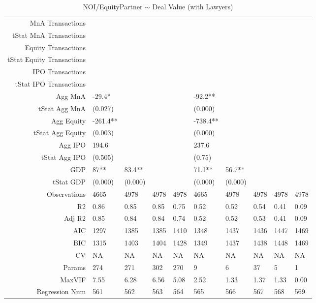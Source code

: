 \begin{table}[ht]
\begin{tabular}{rlllllllll}
  MnA Transactions &  &  &  &  &  &  &  &  &  \\ 
  tStat MnA Transactions &  &  &  &  &  &  &  &  &  \\ 
  Equity Transactions &  &  &  &  &  &  &  &  &  \\ 
  tStat Equity Transactions &  &  &  &  &  &  &  &  &  \\ 
  IPO Transactions &  &  &  &  &  &  &  &  &  \\ 
  tStat IPO Transactions &  &  &  &  &  &  &  &  &  \\ 
  Agg MnA & -29.4* &  &  &  & -92.2** &  &  &  &  \\ 
  tStat Agg MnA & (0.027) &  &  &  & (0.000) &  &  &  &  \\ 
  Agg Equity & -261.4** &  &  &  & -738.4** &  &  &  &  \\ 
  tStat Agg Equity & (0.003) &  &  &  & (0.000) &  &  &  &  \\ 
  Agg IPO & 194.6 &  &  &  & 237.6 &  &  &  &  \\ 
  tStat Agg IPO & (0.505) &  &  &  & (0.75) &  &  &  &  \\ 
  GDP & 87** & 83.4** &  &  & 71.1** & 56.7** &  &  &  \\ 
  tStat GDP & (0.000) & (0.000) &  &  & (0.000) & (0.000) &  &  &  \\ 
  Observations & 4665 & 4978 & 4978 & 4978 & 4665 & 4978 & 4978 & 4978 & 4978 \\ 
  R2 & 0.86 & 0.85 & 0.85 & 0.75 & 0.52 & 0.52 & 0.54 & 0.41 & 0.09 \\ 
  Adj R2 & 0.85 & 0.84 & 0.84 & 0.74 & 0.52 & 0.52 & 0.53 & 0.41 & 0.09 \\ 
  AIC & 1297 & 1385 & 1385 & 1410 & 1348 & 1437 & 1436 & 1447 & 1469 \\ 
  BIC & 1315 & 1403 & 1404 & 1428 & 1349 & 1437 & 1438 & 1448 & 1469 \\ 
  CV & NA & NA & NA & NA & NA & NA & NA & NA & NA \\ 
  Params & 274 & 271 & 302 & 270 & 9 & 6 & 37 & 5 & 1 \\ 
  MaxVIF & 7.55 & 6.28 & 6.56 & 5.08 & 2.52 & 1.33 & 1.37 & 1.33 & 0.00 \\ 
  Regression Num & 561 & 562 & 563 & 564 & 565 & 566 & 567 & 568 & 569 \\ 
   \hline
\end{tabular}
\caption{NOI/EquityPartner $\sim$ Deal Value (with Lawyers)} 
\end{table}
